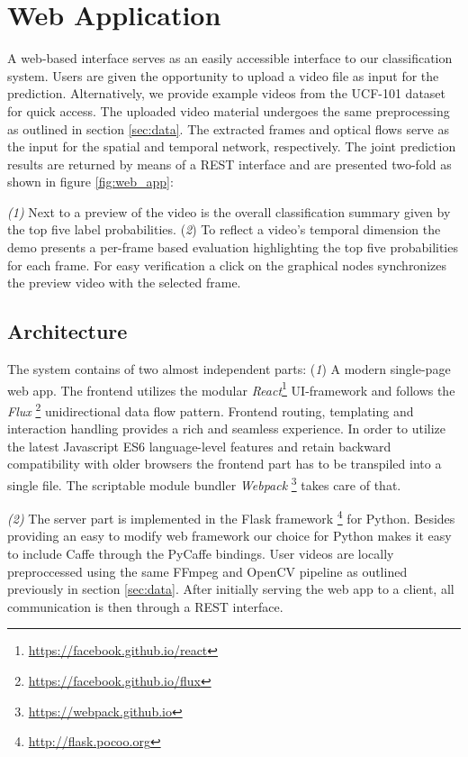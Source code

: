 \section{Web Application}
\label{sec:web}

A web-based interface serves as an easily accessible interface to our classification system.
Users are given the opportunity to upload a video file as input for the prediction.
Alternatively, we provide example videos from the UCF-101 dataset for quick access.
The uploaded video material undergoes the same preprocessing as outlined in section \ref{sec:data}.
The extracted frames and optical flows serve as the input for the spatial and temporal network, respectively.
The joint prediction results are returned by means of a REST interface and are presented two-fold as shown in figure \ref{fig:web_app}:

\textit{(1)} Next to a preview of the video is the overall classification summary given by the top five label probabilities.
(\textit{2}) To reflect a video’s temporal dimension the demo presents a per-frame based evaluation highlighting the top five probabilities for each frame.
For easy verification a click on the graphical nodes synchronizes the preview video with the selected frame.

\subsection{Architecture}
The system contains of two almost independent parts:
(\textit{1}) A modern single-page web app.
The frontend utilizes the modular \textit{React}\footnote{\url{https://facebook.github.io/react}} UI-framework and follows the \textit{Flux} \footnote{\url{https://facebook.github.io/flux}} unidirectional data flow pattern.
Frontend routing, templating and interaction handling provides a rich and seamless experience.
In order to utilize the latest Javascript ES6 language-level features and retain backward compatibility with older browsers the frontend part has to be transpiled into a single file.
The scriptable module bundler \textit{Webpack} \footnote{\url{https://webpack.github.io}} takes care of that.

\textit{(2)} The server part is implemented in the Flask framework \footnote{\url{http://flask.pocoo.org}} for Python.
Besides providing an easy to modify web framework our choice for Python makes it easy to include Caffe through the PyCaffe bindings.
User videos are locally preproccessed using the same FFmpeg and OpenCV pipeline as outlined previously in section \ref{sec:data}.
After initially serving the web app to a client, all communication is then through a REST interface.

